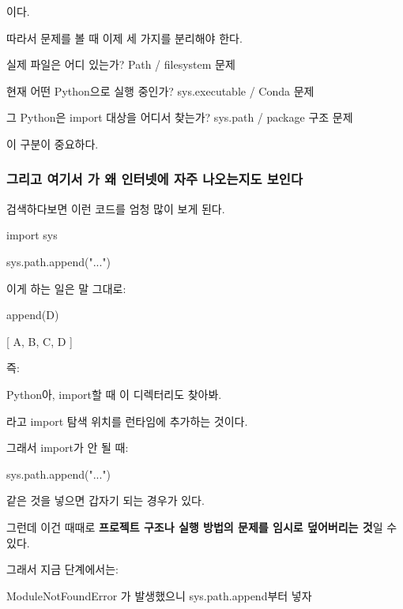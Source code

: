 이다.

따라서 문제를 볼 때 이제 세 가지를 분리해야 한다.

\begin{dhksmry}[centered]
실제 파일은 어디 있는가?
\da
Path / filesystem 문제



현재 어떤 Python으로 실행 중인가?
\da
sys.executable / Conda 문제



그 Python은 import 대상을 어디서 찾는가?
\da
sys.path / package 구조 문제
\end{dhksmry}

이 구분이 중요하다.

\subsubsection{그리고 여기서 가 왜 인터넷에 자주 나오는지도 보인다}

검색하다보면 이런 코드를 엄청 많이 보게 된다.

\begin{dhkcode}
import sys

sys.path.append("...")
\end{dhkcode}

이게 하는 일은 말 그대로:

\begin{dhksmry}
[
    A,
    B,
    C
]

append(D)

[
    A,
    B,
    C,
    D
]
\end{dhksmry}

즉:

\begin{dhksmry}[centered]
Python아, import할 때 이 디렉터리도 찾아봐.
\end{dhksmry}

라고 import 탐색 위치를 런타임에 추가하는 것이다.

그래서 import가 안 될 때:

\begin{dhkcode}
sys.path.append("...")
\end{dhkcode}

같은 것을 넣으면 갑자기 되는 경우가 있다.

그런데 이건 때때로 \textbf{프로젝트 구조나 실행 방법의 문제를 임시로 덮어버리는 것}일 수 있다.

그래서 지금 단계에서는:

\begin{dhksmry}[centered]
ModuleNotFoundError 가 발생했으니 sys.path.append부터 넣자
\end{dhksmry}

